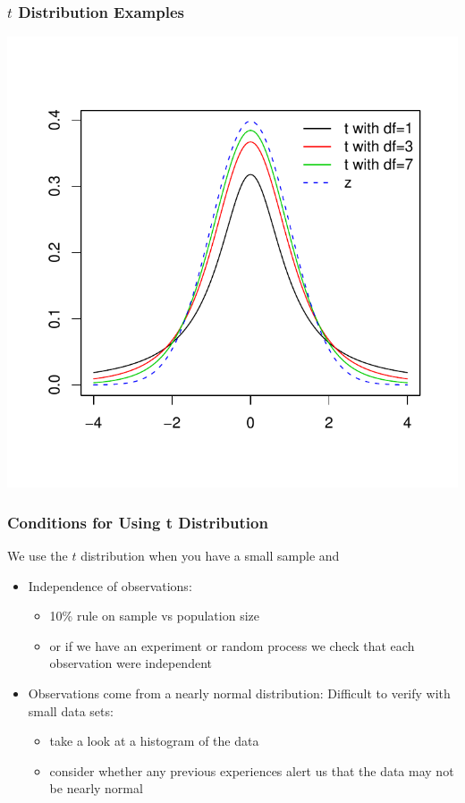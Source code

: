 \documentclass[slides]{beamer}
\newcommand{\blue}[1]{\textcolor{blue2}{#1}}
\begin{document}
\begin{frame}
\frametitle{$t$ Distribution Examples}
\begin{center}
\includegraphics{lec16-004}
\end{center}
\end{frame}


\begin{frame}
\frametitle{Conditions for Using t Distribution}
We use the $t$ distribution when you have a \blue{small sample} and

\begin{itemize}
\pause \item \blue{Independence of observations}:
\begin{itemize}
\item 10\% rule on sample vs population size
\item or if we have an experiment or random process we check that each observation were independent
\end{itemize}
\pause \item \blue{Observations come from a nearly normal distribution}:  Difficult to verify with small data sets:
\begin{itemize}
\item take a look at a histogram of the data
\item consider whether any previous experiences alert us that the data may not be nearly normal
\end{itemize}
\end{itemize}  	
\end{frame}
\end{document}
